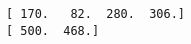 \documentclass[11pt]{article}
\begin{document}
    \begin{Verbatim}[commandchars=\\\{\}]
[ 170.   82.  280.  306.]
[ 500.  468.]

    \end{Verbatim}

    \begin{center}
    \end{center}
    { \hspace*{\fill} \\}
    

    
    
    
    
\end{document}
